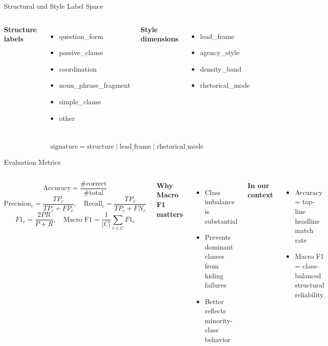 \documentclass[aspectratio=169, 11pt]{beamer}
\begin{document}
\begin{frame}{Structural and Style Label Space}
  \begin{columns}
    \textbf{Structure labels}
    \begin{itemize}
      \item question\_form
      \item passive\_clause
      \item coordination
      \item noun\_phrase\_fragment
      \item simple\_clause
      \item other
    \end{itemize}

    \textbf{Style dimensions}
    \begin{itemize}
      \item lead\_frame
      \item agency\_style
      \item density\_band
      \item rhetorical\_mode
    \end{itemize}
  \end{columns}

  \vspace{0.8em}

  \[
  \text{signature} = \text{structure}\;|\;\text{lead\_frame}\;|\;\text{rhetorical\_mode}
  \]
\end{frame}

\begin{frame}{Evaluation Metrics}
  \begin{columns}
    \[
    \text{Accuracy} = \frac{\#\text{correct}}{\#\text{total}}
    \]
    \[
    \text{Precision}_c = \frac{TP_c}{TP_c + FP_c},\quad
    \text{Recall}_c = \frac{TP_c}{TP_c + FN_c}
    \]
    \[
    F1_c = \frac{2PR}{P+R},\quad
    \text{Macro F1} = \frac{1}{|C|}\sum_{c\in C} F1_c
    \]

    \textbf{Why Macro F1 matters}
    \begin{itemize}
      \item Class imbalance is substantial
      \item Prevents dominant classes from hiding failures
      \item Better reflects minority-class behavior
    \end{itemize}

    \vspace{0.6em}
    \textbf{In our context}
    \begin{itemize}
      \item Accuracy = top-line headline match rate
      \item Macro F1 = class-balanced structural reliability
    \end{itemize}
  \end{columns}
\end{frame}
\end{document}
